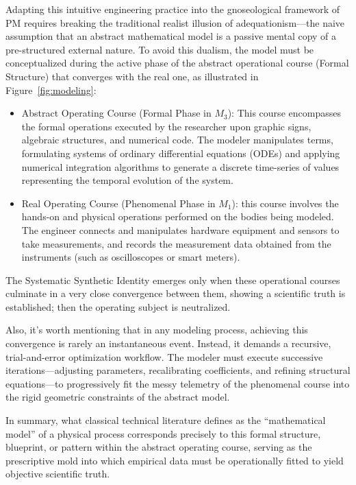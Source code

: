 \documentclass[11pt, a4paper]{article}
\begin{document}
Adapting this intuitive engineering practice into the gnoseological framework of PM requires breaking the traditional realist illusion of adequationism—the naive assumption that an abstract mathematical model is a passive mental copy of a pre-structured external nature. To avoid this dualism, the model must be conceptualized during the active phase of the abstract operational course (Formal Structure) that converges with the real one, as illustrated in Figure~\ref{fig:modeling}:

\begin{itemize}
\item {Abstract Operating Course (Formal Phase in
$M_3$):} This course encompasses the formal operations executed by the researcher upon graphic signs, algebraic structures, and numerical code. The modeler manipulates terms, formulating systems of ordinary differential equations (ODEs) and applying numerical integration algorithms to generate a discrete time-series of values representing the temporal evolution of the system.

\item {Real Operating Course (Phenomenal Phase in
$M_1$)}: this course involves the hands-on and physical operations performed on the bodies being modeled. The engineer connects and manipulates hardware equipment and sensors to take measurements, and records the measurement data obtained from the instruments (such as oscilloscopes or smart meters).
\end{itemize}

The  Systematic Synthetic Identity emerges only when these operational courses
culminate in a very close convergence between them, showing a scientific truth is established; then the operating subject is neutralized.

Also, it's worth mentioning that in any modeling process, achieving this convergence is rarely an instantaneous event. Instead, it demands a recursive, trial-and-error optimization workflow. The modeler must execute successive iterations—adjusting parameters, recalibrating coefficients, and refining structural equations—to progressively fit the messy telemetry of the phenomenal course into the rigid geometric constraints of the abstract model.


In summary, what classical technical literature defines as the ``mathematical model'' of a physical process corresponds precisely to this formal structure, blueprint, or pattern within the abstract operating course, serving as the prescriptive mold into which empirical data must be operationally fitted to yield objective scientific truth.
\end{document}
